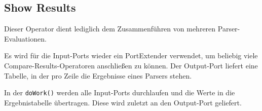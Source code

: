 \subsection{Show Results}

Dieser Operator dient lediglich dem Zusammenführen von mehreren Parser-Evaluationen. 

Es wird für die Input-Ports wieder ein PortExtender verwendet, um beliebig viele Compare-Results-Operatoren anschließen zu können. Der Output-Port liefert eine Tabelle, in der pro Zeile die Ergebnisse eines Parsers stehen.

In der \texttt{doWork()} werden alle Input-Ports durchlaufen und die Werte in die Ergebnistabelle übertragen. Diese wird zuletzt an den Output-Port geliefert.
